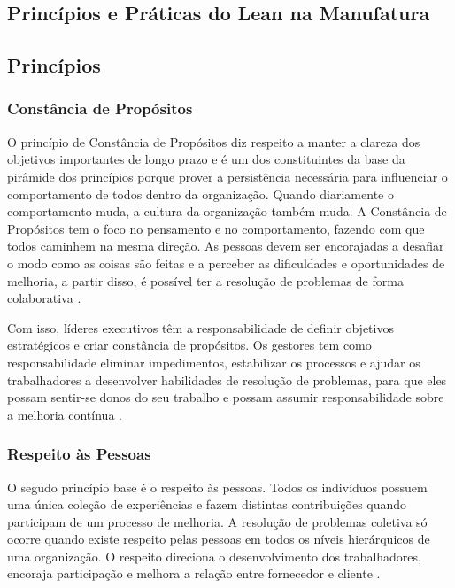 \begin{anexosenv}

\partanexos

\chapter{Princípios e Práticas do Lean na Manufatura}

\section[Princípios]{Princípios}

\subsection[Constância de Propósitos]{Constância de Propósitos}

O princípio de Constância de Propósitos diz respeito a manter a clareza dos objetivos importantes de longo prazo e é um dos constituintes da base da pirâmide dos princípios porque prover a persistência necessária para influenciar o comportamento de todos dentro da organização. Quando diariamente o comportamento muda, a cultura da organização também muda. A Constância de Propósitos tem o foco no pensamento e no comportamento, fazendo com que todos caminhem na mesma direção. As pessoas devem ser encorajadas a desafiar o modo como as coisas são feitas e a perceber as dificuldades e oportunidades de melhoria, a partir disso, é possível ter a resolução de problemas de forma colaborativa \cite{bell2011}.

Com isso, líderes executivos têm a responsabilidade de definir objetivos estratégicos e criar constância de propósitos. Os gestores tem como responsabilidade eliminar impedimentos, estabilizar os processos e ajudar os trabalhadores a desenvolver habilidades de resolução de problemas, para que eles possam sentir-se donos do seu trabalho e possam assumir responsabilidade sobre a melhoria contínua  \cite{bell2011}. 


\subsection[Respeito às Pessoas]{Respeito às Pessoas}

O segudo princípio base é o respeito às pessoas. Todos os indivíduos possuem uma única coleção de experiências e fazem distintas contribuições quando participam de um processo de melhoria. A resolução de problemas coletiva só ocorre quando existe respeito pelas pessoas em todos os níveis hierárquicos de uma organização. O respeito direciona o desenvolvimento dos trabalhadores, encoraja participação e melhora a relação entre fornecedor e cliente \cite{bell2011}.


\end{anexosenv}
